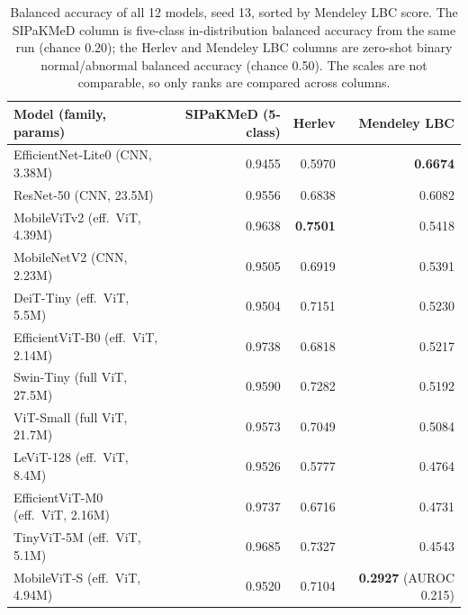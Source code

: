 \documentclass[12pt,letterpaper]{article}
\begin{document}
\begin{table}[htbp]
\centering
\caption{Balanced accuracy of all 12 models, seed 13, sorted by Mendeley LBC score. The SIPaKMeD column is five-class in-distribution balanced accuracy from the same run (chance 0.20); the Herlev and Mendeley LBC columns are zero-shot binary normal/abnormal balanced accuracy (chance 0.50). The scales are not comparable, so only ranks are compared across columns.}
\label{tab:shift12}
\small
\begin{tabular}{lrrr}
\toprule
Model (family, params) & SIPaKMeD (5-class) & Herlev & Mendeley LBC \\
\midrule
EfficientNet-Lite0 (CNN, 3.38M) & 0.9455 & 0.5970 & \textbf{0.6674} \\
ResNet-50 (CNN, 23.5M) & 0.9556 & 0.6838 & 0.6082 \\
MobileViTv2 (eff.\ ViT, 4.39M) & 0.9638 & \textbf{0.7501} & 0.5418 \\
MobileNetV2 (CNN, 2.23M) & 0.9505 & 0.6919 & 0.5391 \\
DeiT-Tiny (eff.\ ViT, 5.5M) & 0.9504 & 0.7151 & 0.5230 \\
EfficientViT-B0 (eff.\ ViT, 2.14M) & 0.9738 & 0.6818 & 0.5217 \\
Swin-Tiny (full ViT, 27.5M) & 0.9590 & 0.7282 & 0.5192 \\
ViT-Small (full ViT, 21.7M) & 0.9573 & 0.7049 & 0.5084 \\
LeViT-128 (eff.\ ViT, 8.4M) & 0.9526 & 0.5777 & 0.4764 \\
EfficientViT-M0 (eff.\ ViT, 2.16M) & 0.9737 & 0.6716 & 0.4731 \\
TinyViT-5M (eff.\ ViT, 5.1M) & 0.9685 & 0.7327 & 0.4543 \\
MobileViT-S (eff.\ ViT, 4.94M) & 0.9520 & 0.7104 & \textbf{0.2927} (AUROC 0.215) \\
\bottomrule
\end{tabular}
\end{table}
\end{document}
